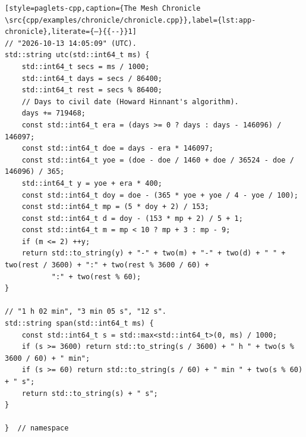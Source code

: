\begin{lstlisting}[style=paglets-cpp,caption={The Mesh Chronicle \src{cpp/examples/chronicle/chronicle.cpp}},label={lst:app-chronicle},literate={–}{{--}}1]
// "2026-10-13 14:05:09" (UTC).
std::string utc(std::int64_t ms) {
    std::int64_t secs = ms / 1000;
    std::int64_t days = secs / 86400;
    std::int64_t rest = secs % 86400;
    // Days to civil date (Howard Hinnant's algorithm).
    days += 719468;
    const std::int64_t era = (days >= 0 ? days : days - 146096) / 146097;
    const std::int64_t doe = days - era * 146097;
    const std::int64_t yoe = (doe - doe / 1460 + doe / 36524 - doe / 146096) / 365;
    std::int64_t y = yoe + era * 400;
    const std::int64_t doy = doe - (365 * yoe + yoe / 4 - yoe / 100);
    const std::int64_t mp = (5 * doy + 2) / 153;
    const std::int64_t d = doy - (153 * mp + 2) / 5 + 1;
    const std::int64_t m = mp < 10 ? mp + 3 : mp - 9;
    if (m <= 2) ++y;
    return std::to_string(y) + "-" + two(m) + "-" + two(d) + " " + two(rest / 3600) + ":" + two(rest % 3600 / 60) +
           ":" + two(rest % 60);
}

// "1 h 02 min", "3 min 05 s", "12 s".
std::string span(std::int64_t ms) {
    const std::int64_t s = std::max<std::int64_t>(0, ms) / 1000;
    if (s >= 3600) return std::to_string(s / 3600) + " h " + two(s % 3600 / 60) + " min";
    if (s >= 60) return std::to_string(s / 60) + " min " + two(s % 60) + " s";
    return std::to_string(s) + " s";
}

}  // namespace


\end{lstlisting}
